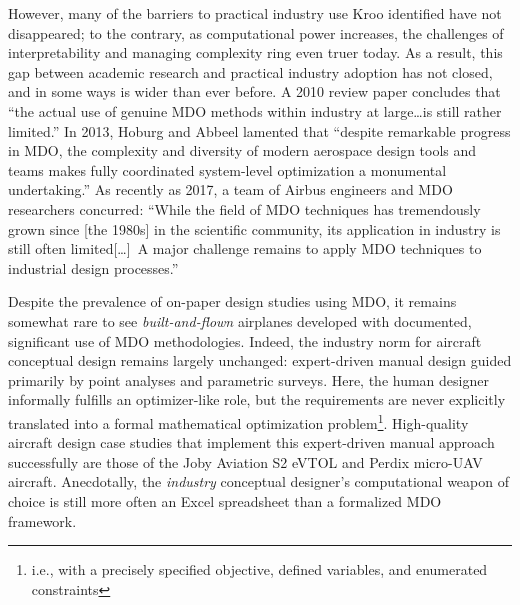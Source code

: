 \documentclass[12pt,vi,oneside,table]{report}
\begin{document}
    However, many of the barriers to practical industry use Kroo identified have not disappeared; to the contrary, as computational power increases, the challenges of interpretability and managing complexity ring even truer today. As a result, this gap between academic research and practical industry adoption has not closed, and in some ways is wider than ever before. A 2010 review paper \cite{agte_mdo_2010} concludes that ``the actual use of genuine MDO methods within industry at large\dots is still rather limited.'' In 2013, Hoburg and Abbeel lamented that ``despite remarkable progress in MDO, the complexity and diversity of modern aerospace design tools and teams makes fully coordinated system-level optimization a monumental undertaking.'' \cite{hoburg_geometric_2014} As recently as 2017, a team of Airbus engineers and MDO researchers concurred: ``While the field of MDO techniques has tremendously grown since [the 1980s] in the scientific community, its application in industry is still often limited[\dots]\ A major challenge remains to apply MDO techniques to industrial design processes.'' \cite{gazaix_industrialization_2017}


    Despite the prevalence of on-paper design studies using MDO, it remains somewhat rare to see \textit{built-and-flown} airplanes developed with documented, significant use of MDO methodologies. Indeed, the industry norm for aircraft conceptual design remains largely unchanged: expert-driven manual design guided primarily by point analyses and parametric surveys. Here, the human designer informally fulfills an optimizer-like role, but the requirements are never explicitly translated into a formal mathematical optimization problem\footnote{i.e., with a precisely specified objective, defined variables, and enumerated constraints}. High-quality aircraft design case studies that implement this expert-driven manual approach successfully are those of the Joby Aviation S2 eVTOL \cite{stoll_conceptual_2014} and Perdix micro-UAV \cite{tao_design_2012} aircraft. Anecdotally, the \textit{industry} conceptual designer's computational weapon of choice is still more often an Excel spreadsheet than a formalized MDO framework.
\end{document}
